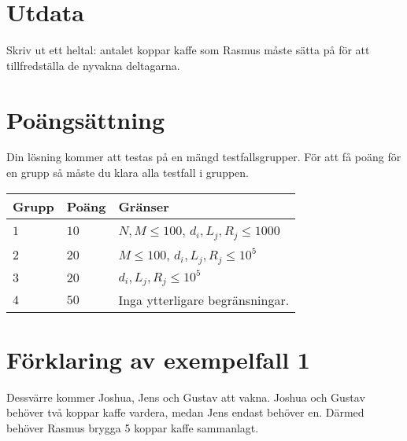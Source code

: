 \section*{Utdata}
Skriv ut ett heltal: antalet koppar kaffe som Rasmus måste sätta på för att tillfredställa de nyvakna deltagarna.

\section*{Poängsättning}
Din lösning kommer att testas på en mängd testfallsgrupper.
För att få poäng för en grupp så måste du klara alla testfall i gruppen.

\noindent
\begin{tabular}{| l | l | p{12cm} |}
  \hline
  \textbf{Grupp} & \textbf{Poäng} & \textbf{Gränser} \\ \hline
  $1$    & $10$       & $N, M \le 100$, $d_i, L_j, R_j \le 1000$ \\ \hline
  $2$    & $20$       & $M \le 100$, $d_i, L_j, R_j \le 10^5$ \\ \hline
  $3$    & $20$       & $d_i, L_j, R_j \le 10^5$ \\ \hline
  $4$    & $50$       & Inga ytterligare begränsningar. \\ \hline
\end{tabular}

\section*{Förklaring av exempelfall 1}
Dessvärre kommer Joshua, Jens och Gustav att vakna. Joshua och Gustav behöver två koppar kaffe vardera, medan Jens endast behöver en.
Därmed behöver Rasmus brygga 5 koppar kaffe sammanlagt.
